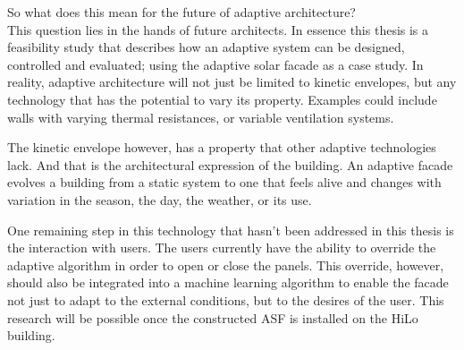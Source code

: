 So what does this mean for the future of adaptive architecture? \\

This question lies in the hands of future architects. In essence this thesis is a feasibility study that describes how an adaptive system can be designed, controlled and evaluated; using the adaptive solar facade as a case study. In reality, adaptive architecture will not just be limited to kinetic envelopes, but any technology that has the potential to vary its property. Examples could include walls with varying thermal resistances, or variable ventilation systems. 

The kinetic envelope however, has a property that other adaptive technologies lack. And that is the architectural expression of the building. An adaptive facade evolves a building from a static system to one that feels alive and changes with variation in the season, the day, the weather, or its use. 

One remaining step in this technology that hasn't been addressed in this thesis is the interaction with users. The users currently have the ability to override the adaptive algorithm in order to open or close the panels. This override, however, should also be integrated into a machine learning algorithm to enable the facade not just to adapt to the external conditions, but to the desires of the user. This research will be possible once the constructed ASF is installed on the HiLo building.








